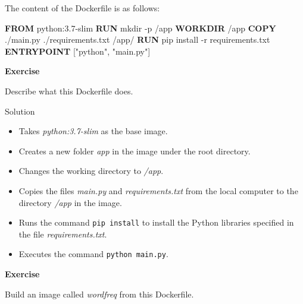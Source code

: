 \documentclass[
]{article}
\newenvironment{Shaded}{\begin{snugshade}}{\end{snugshade}}
\newcommand{\KeywordTok}[1]{\textcolor[rgb]{0.13,0.29,0.53}{\textbf{#1}}}
\newcommand{\NormalTok}[1]{#1}
\newcommand{\StringTok}[1]{\textcolor[rgb]{0.31,0.60,0.02}{#1}}
\providecommand{\tightlist}{%
  \setlength{\itemsep}{0pt}\setlength{\parskip}{0pt}}
\newenvironment{infobox}[1]
  {
  \begin{itemize}
  \renewcommand{\labelitemi}{
    \raisebox{-.7\height}[0pt][0pt]{
      
    }
  }
  \setlength{\fboxsep}{1em}
  \begin{whitebox}
  \item
  }
  {
  \end{whitebox}
  \end{itemize}
  }
\theoremstyle{definition}
\theoremstyle{definition}
\theoremstyle{definition}
\theoremstyle{remark}
\let\BeginKnitrBlock\begin \let\EndKnitrBlock\end
\begin{document}
The content of the Dockerfile is as follows:

\begin{Shaded}
\begin{Highlighting}[]
\KeywordTok{FROM}\NormalTok{ python:3.7{-}slim}
\KeywordTok{RUN}\NormalTok{ mkdir {-}p /app}
\KeywordTok{WORKDIR}\NormalTok{ /app}
\KeywordTok{COPY}\NormalTok{ ./main.py ./requirements.txt /app/}
\KeywordTok{RUN}\NormalTok{ pip install {-}r requirements.txt}
\KeywordTok{ENTRYPOINT}\NormalTok{ [}\StringTok{"python"}\NormalTok{, }\StringTok{"main.py"}\NormalTok{]}
\end{Highlighting}
\end{Shaded}

\begin{infobox}{exercisebox}

\textbf{Exercise}

\BeginKnitrBlock{exercise}
\protect\hypertarget{exr:unnamed-chunk-19}{}{\label{exr:unnamed-chunk-19} }Describe what this Dockerfile does.
\EndKnitrBlock{exercise}

\end{infobox}

Solution

\begin{infobox}{exercisebox}

\begin{itemize}
\tightlist
\item
  Takes \emph{python:3.7-slim} as the base image.
\item
  Creates a new folder \emph{app} in the image under the root directory.
\item
  Changes the working directory to \emph{/app}.
\item
  Copies the files \emph{main.py} and \emph{requirements.txt} from the local
  computer to the directory \emph{/app} in the image.
\item
  Runs the command \texttt{pip\ install} to install the Python libraries
  specified in the file \emph{requirements.txt}.
\item
  Executes the command \texttt{python\ main.py}.
\end{itemize}

\end{infobox}

\textbf{Exercise}

\BeginKnitrBlock{exercise}
\protect\hypertarget{exr:unnamed-chunk-20}{}{\label{exr:unnamed-chunk-20} }Build an image called \emph{wordfreq} from this Dockerfile.
\EndKnitrBlock{exercise}
\end{document}
